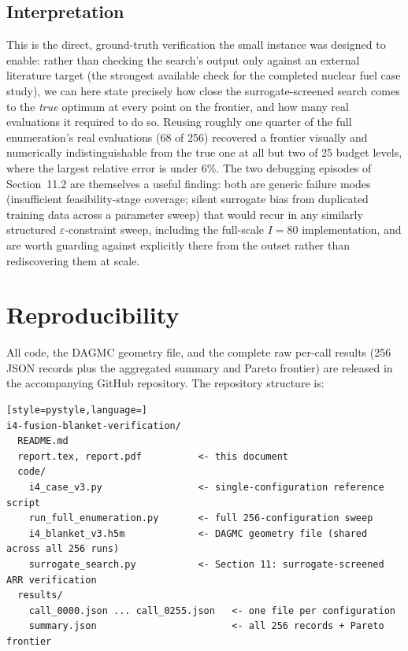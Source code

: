 \documentclass[11pt]{article}
\begin{document}
\subsection{Interpretation}

This is the direct, ground-truth verification the small instance was
designed to enable: rather than checking the search's output only against
an external literature target (the strongest available check for the
completed nuclear fuel case study), we can here state precisely how close
the surrogate-screened search comes to the \emph{true} optimum at every
point on the frontier, and how many real evaluations it required to do so.
Reusing roughly one quarter of the full enumeration's real evaluations
(68 of 256) recovered a frontier visually and numerically
indistinguishable from the true one at all but two of 25 budget levels,
where the largest relative error is under 6\%. The two debugging episodes
of Section~11.2 are themselves a useful finding: both are generic failure
modes (insufficient feasibility-stage coverage; silent surrogate bias from
duplicated training data across a parameter sweep) that would recur in any
similarly structured $\varepsilon$-constraint sweep, including the
full-scale $I=80$ implementation, and are worth guarding against
explicitly there from the outset rather than rediscovering them at scale.

\section{Reproducibility}

All code, the DAGMC geometry file, and the complete raw per-call results
(256 JSON records plus the aggregated summary and Pareto frontier) are
released in the accompanying GitHub repository. The repository structure
is:

\begin{lstlisting}[style=pystyle,language=]
i4-fusion-blanket-verification/
  README.md
  report.tex, report.pdf          <- this document
  code/
    i4_case_v3.py                 <- single-configuration reference script
    run_full_enumeration.py       <- full 256-configuration sweep
    i4_blanket_v3.h5m             <- DAGMC geometry file (shared across all 256 runs)
    surrogate_search.py           <- Section 11: surrogate-screened ARR verification
  results/
    call_0000.json ... call_0255.json   <- one file per configuration
    summary.json                        <- all 256 records + Pareto frontier
\end{lstlisting}
\end{document}
